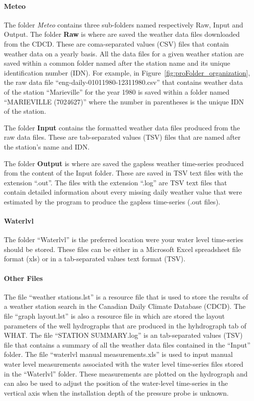 \documentclass[WHATMANUAL.tex]{subfiles}
\begin{document}
\paragraph{Meteo} The folder \emph{Meteo} contains three sub-folders named respectively Raw, Input and Output. The folder \textbf{Raw} is where are saved the weather data files downloaded from the CDCD. These are coma-separated values (CSV) files that contain weather data on a yearly basis. All the data files for a given weather station are saved within a common folder named after the station name and its unique identification number (IDN). For example, in Figure~\ref{fig:proFolder_organization}, the raw data file ``eng-daily-01011980-12311980.csv'' that contains weather data of the station ``Marieville'' for the year 1980 is saved within a folder named ``MARIEVILLE (7024627)'' where the number in parentheses is the unique IDN of the station.

The folder \textbf{Input} contains the formatted weather data files produced from the raw data files. These are tab-separated values (TSV) files that are named after the station's name and IDN.

The folder \textbf{Output} is where are saved the gapless weather time-series produced from the content of the Input folder. These are saved in TSV text files with the extension ``.out''. The files with the extension ``.log'' are TSV text files that contain detailed information about every missing daily weather value that were estimated by the program to produce the gapless time-series (.out files).

\paragraph{Waterlvl} The folder ``Waterlvl'' is the preferred location were your water level time-series should be stored. These files can be  either in a Microsoft Excel spreadsheet file format (xls) or in a tab-separated values text format (TSV).

\paragraph{Other Files} The file ``weather stations.lst'' is a resource file that is used to store the results of a weather station search in the Canadian Daily Climate Database (CDCD). The file ``graph layout.lst'' is also a resource file in which are stored the layout parameters of the well hydrographs that are produced in the hyhdrograph tab of WHAT. The file ``STATION SUMMARY.log'' is an tab-separated values (TSV) file that contains a summary of all the weather data files contained in the ``Input'' folder. The file ``waterlvl manual measurements.xls'' is used to input manual water level measurements associated with the water level time-series files stored in the ``Waterlvl'' folder. These measurements are plotted on the hydrograph and can also be used to adjust the position of the water-level time-series in the vertical axis when the installation depth of the pressure probe is unknown.\vspace{1cm}
\end{document}
